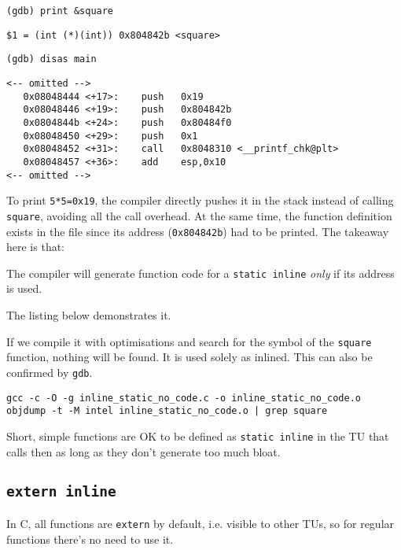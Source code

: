 \begin{lstlisting}[style=terminal]
(gdb) print &square
\end{lstlisting}
\begin{verbatim}
$1 = (int (*)(int)) 0x804842b <square>
\end{verbatim}
\begin{lstlisting}[style=terminal]
(gdb) disas main
\end{lstlisting}
\begin{verbatim}
<-- omitted -->
   0x08048444 <+17>:	push   0x19
   0x08048446 <+19>:	push   0x804842b
   0x0804844b <+24>:	push   0x80484f0
   0x08048450 <+29>:	push   0x1
   0x08048452 <+31>:	call   0x8048310 <__printf_chk@plt>
   0x08048457 <+36>:	add    esp,0x10
<-- omitted -->
\end{verbatim}
To print \texttt{5*5=0x19}, the compiler directly pushes it in the stack instead of calling \texttt{square}, avoiding all the call overhead. At the same time, the function definition exists in the file since its address (\texttt{0x804842b}) had to be printed. The takeaway here is that:
\begin{takeaway}
The compiler will generate function code for a \texttt{static inline} \textit{only} if its address is used.
\end{takeaway}
The listing below demonstrates it.

If we compile it with optimisations and search for the symbol of the \texttt{square} function, nothing will be found. It is used solely as inlined. This can also be confirmed by \texttt{gdb}.
\begin{lstlisting}[style=terminal]
gcc -c -O -g inline_static_no_code.c -o inline_static_no_code.o
objdump -t -M intel inline_static_no_code.o | grep square
\end{lstlisting}
\begin{takeaway}
Short, simple functions are OK to be defined as \texttt{static inline} in the TU that calls then as long as they don't generate too much bloat.
\end{takeaway}


\subsection{\texttt{extern inline}}

In C, all functions are \texttt{extern} by default, i.e. visible to other TUs, so for regular functions there's no need to use it. 



